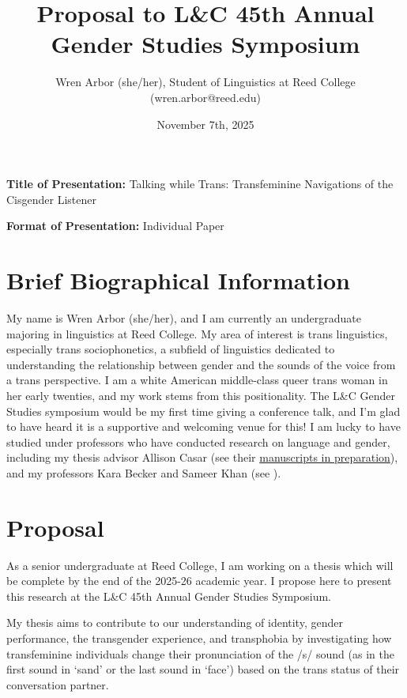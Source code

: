 \documentclass[11pt]{article}
\title{Proposal to L\&C 45th Annual Gender Studies Symposium}
\author{Wren Arbor (she/her), Student of Linguistics at Reed College (wren.arbor@reed.edu)}
\date{November 7th, 2025}
\begin{document}
\maketitle

\noindent \textbf{Title of Presentation:} Talking while Trans: Transfeminine Navigations of the Cisgender Listener

\noindent \textbf{Format of Presentation:} Individual Paper


\section{Brief Biographical Information}

My name is Wren Arbor (she/her), and I am currently an undergraduate majoring in linguistics at Reed College. My area of interest is trans linguistics, especially trans sociophonetics, a subfield of linguistics dedicated to understanding the relationship between gender and the sounds of the voice from a trans perspective. I am a white American middle-class queer trans  woman in her early twenties, and my work stems from this positionality. The L\&C Gender Studies symposium would be my first time giving a conference talk, and I'm glad to have heard it is a supportive and welcoming venue for this! I am lucky to have studied under professors who have conducted research on language and gender, including my thesis advisor Allison Casar (see their \href{https://sites.google.com/view/allisontrcasar/research-projects?authuser=0#h.tnc9nc20jtg2}{manuscripts in preparation}), and my professors Kara Becker and Sameer Khan (see \cite{becker_beyond_2022}). 

\section{Proposal}

As a senior undergraduate at Reed College, I am working on a thesis which will be complete by the end of the 2025-26 academic year. I propose here to present this research at the L\&C 45th Annual Gender Studies Symposium.

My thesis aims to contribute to our understanding of identity,  gender performance, the transgender experience, and transphobia by investigating how transfeminine individuals change their pronunciation of the /s/ sound (as in the first sound in `sand' or the last sound in `face') based on the trans status of their conversation partner. 
\end{document}

